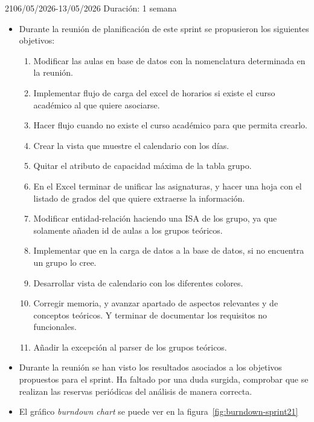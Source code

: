 \begin{Sprint}{21}{06/05/2026-13/05/2026}
	Duración: 1 semana
	\begin{itemize}	
		\item{}
		Durante la reunión de planificación de este sprint se propusieron los siguientes objetivos:
		\begin{enumerate}
			\item Modificar las aulas en base de datos con la nomenclatura determinada en la reunión.
			\item Implementar flujo de carga del excel de horarios si existe el curso académico al que quiere asociarse.
			\item Hacer flujo cuando no existe el curso académico para que permita crearlo.
			\item Crear la vista que muestre el calendario con los días.
			\item Quitar el atributo de capacidad máxima de la tabla grupo.
			\item En el Excel terminar de unificar las asignaturas, y hacer una hoja con el listado de grados del que quiere extraerse la información.
			\item Modificar entidad-relación haciendo una ISA de los grupo, ya que solamente añaden id de aulas a los grupos teóricos.
			\item Implementar que en la carga de datos a la base de datos, si no encuentra un grupo lo cree.
			\item Desarrollar vista de calendario con los diferentes colores.
			\item Corregir memoria, y avanzar apartado de aspectos relevantes y de conceptos teóricos. Y terminar de documentar los requisitos no funcionales.
			\item Añadir la excepción al parser de los grupos teóricos.
		\end{enumerate}
		\item{}
		Durante la reunión se han visto los resultados asociados a los objetivos propuestos para el sprint. Ha faltado por una duda surgida, comprobar que se realizan las reservas periódicas del análisis de manera correcta.
		
		\item{}
		El gráfico \textit{burndown chart} se puede ver en la figura~\ref{fig:burndown-sprint21}
	\end{itemize}
\end{Sprint}


